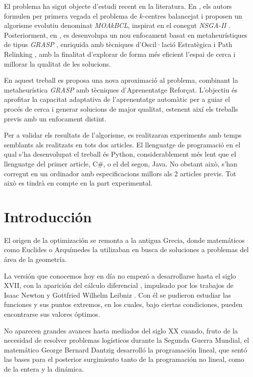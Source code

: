 \documentclass[12pt,a4paper]{book}
\begin{document}
El problema ha sigut objecte d'estudi recent en la literatura. En \cite{k-balanced_1}, els autors formulen per primera vegada el problema de $k$-centres balancejat i proposen un algorisme evolutiu denominat \textit{MOAkBCL}, inspirat en el conegut \textit{NSGA-II \citep{NSGA-II}}. Posteriorment, en \cite{k-Balanced_2}, es desenvolupa un nou enfocament basat en metaheurístiques de tipus \textit{GRASP} \citep{GRASP}, enriquida amb tècniques d'Oscil·lació Estratègica \citep{oscillation} i Path Relinking \citep{path_relinking}, amb la finalitat d'explorar de forma més eficient l'espai de cerca i millorar la qualitat de les solucions.

En aquest treball es proposa una nova aproximació al problema, combinant la metaheurística \textit{GRASP} amb tècniques d'Aprenentatge Reforçat. L'objectiu és aprofitar la capacitat adaptativa de l'aprenentatge automàtic per a guiar el procés de cerca i generar solucions de major qualitat, estenent així els treballs previs amb un enfocament distint.

Per a validar els resultats de l'algorisme, es realitzaran experiments amb temps semblants als realitzats en tots dos articles. El llenguatge de programació en el qual s'ha desenvolupat el treball és Python, considerablement més lent que el llenguatge del primer article, C\#, o el del segon, Java. No obstant això, s'han corregut en un ordinador amb especificacions millors als 2 articles previs. Tot això es tindrà en compte en la part experimental.
\newpage
 
\chapter{Introducción}

El origen de la optimización se remonta a la antigua Grecia, donde matemáticos como Euclides o Arquímedes la utilizaban en busca de soluciones a problemas del área de la geometría.

La versión que conocemos hoy en día no empezó a desarrollarse hasta el siglo XVII, con la aparición del cálculo diferencial \citep{calculo_diferencial}, impulsado por los trabajos de Isaac Newton y Gottfried Wilhelm Leibniz \citep{Leibniz}. Con él se pudieron estudiar las funciones y sus puntos extremos,
en los cuales, bajo ciertas condiciones, pueden encontrarse sus valores óptimos.

No aparecen grandes avances hasta mediados del siglo XX cuando, fruto de la necesidad de resolver problemas logísticos durante la Segunda Guerra Mundial, el matemático George Bernard Dantzig \citep{Dantzig} desarrolló la programación lineal, que sentó las bases para el posterior surgimiento tanto de la programación no lineal, como de la entera y la dinámica.
\end{document}
